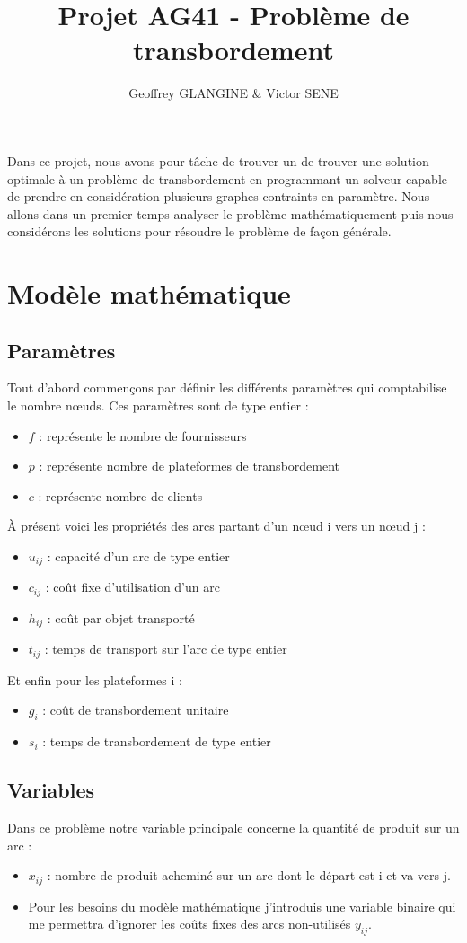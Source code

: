 \documentclass[french]{article}
\author{Geoffrey GLANGINE \& Victor SENE}
\title{Projet AG41 - Problème de transbordement}
\begin{document}
\maketitle
Dans ce projet, nous avons pour tâche de trouver un de trouver une solution optimale à un problème de transbordement en programmant un solveur capable de prendre en considération plusieurs graphes contraints en paramètre. Nous allons dans un premier temps analyser le problème mathématiquement puis nous considérons les solutions pour résoudre le problème de façon générale.

\section{Modèle mathématique}
	\subsection{Paramètres}
	Tout d'abord commençons par définir les différents paramètres qui comptabilise le nombre nœuds. Ces paramètres sont de type entier : 
	\begin{itemize}
		\item $f$ : représente le nombre de fournisseurs
		\item $p$ : représente nombre de plateformes de transbordement
		\item $c$ : représente nombre de clients
	\end{itemize}
	
	À présent voici les propriétés des arcs partant d'un nœud i vers un nœud j :
	\begin{itemize}
		\item$u_{ij}$ : capacité d'un arc de type entier
		\item $c_{ij}$ : coût fixe d'utilisation d'un arc
		\item $h_{ij}$ : coût par objet transporté
		\item $t_{ij}$ : temps de transport sur l'arc de type entier 
	\end{itemize}
	
	Et enfin pour les plateformes i :
	\begin{itemize}
		\item $g_{i}$ : coût de transbordement unitaire
		\item $s_{i}$ : temps de transbordement de type entier
	\end{itemize}
	
	\subsection{Variables}
	Dans ce problème notre variable principale concerne la quantité de produit sur un arc :
	\begin{itemize}
		\item $x_{ij}$ : nombre de produit acheminé sur un arc dont le départ est i et va vers j.
		\item Pour les besoins du modèle mathématique j'introduis une variable binaire qui me permettra d'ignorer les coûts fixes des arcs non-utilisés $y_{ij}$.
	\end{itemize}
\end{document}
